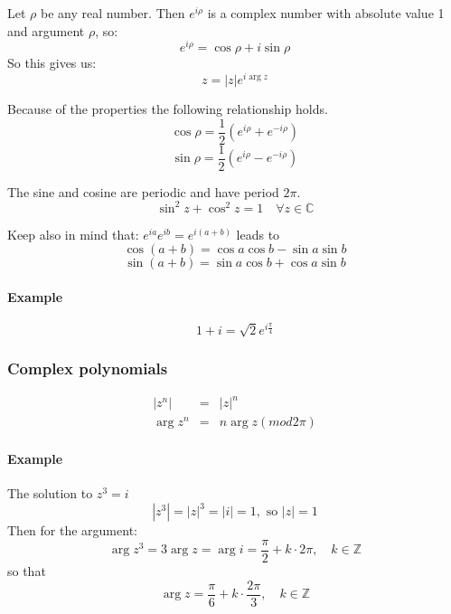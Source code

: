 \documentclass{article}
\begin{document}
			Let $\rho$ be any real number. Then $e^{i\rho}$ is a complex number with absolute value 1 and argument $\rho$, so:
			\begin{equation*}
				e^{i\rho} = \cos{\rho} + i\sin{\rho}
			\end{equation*}
			So this gives us:
			\begin{equation*}
				z = |z|e^{i\arg{z}}
			\end{equation*}
			
			Because of the properties the following relationship holds.
			\begin{equation*}
				\cos{\rho} = \frac{1}{2}(e^{i\rho} + e^{-i\rho})
			\end{equation*}
			\begin{equation*}
				\sin{\rho} = \frac{1}{2}(e^{i\rho} - e^{-i\rho})
			\end{equation*}
			
			The sine and cosine are periodic and have period $2\pi$. 
			\begin{equation*}
				\sin^2{z} + \cos^2{z} = 1 \quad \forall z \in \mathbb{C}
			\end{equation*}
			
			Keep also in mind that: $e^{ia}e^{ib} = e^{i(a+b)}$ leads to
			\begin{equation*}
				\cos{(a+b)} = \cos{a}\cos{b} - \sin{a}\sin{b}
			\end{equation*}
			\begin{equation*}
				\sin{(a+b)} = \sin{a}\cos{b} + \cos{a}\sin{b}
			\end{equation*}

			\paragraph{Example}
				\begin{equation*}
					1+i = \sqrt{2}e^{i\frac{\pi}{4}}
				\end{equation*}
		
		\subsubsection{Complex polynomials}
			\begin{eqnarray}
				|z^n| &=& |z|^n \\
				\arg{z^n} &=& n\arg{z} (mod 2\pi)
			\end{eqnarray}
			
			\paragraph{Example}
			The solution to $z^3=i$
			\begin{equation*}
				|z^3| = |z|^3 = |i| = 1, \text{ so } |z| = 1
			\end{equation*}
			Then for the argument:
			\begin{equation*}
				\arg{z^3} = 3\arg{z} = \arg{i} = \frac{\pi}{2} +k \cdot 2\pi, \quad k\in \mathbb{Z}
			\end{equation*}
			so that
			\begin{equation*}
				\arg{z} = \frac{\pi}{6} + k \cdot \frac{2\pi}{3}, \quad k\in\mathbb{Z}
			\end{equation*}
			
\end{document}
